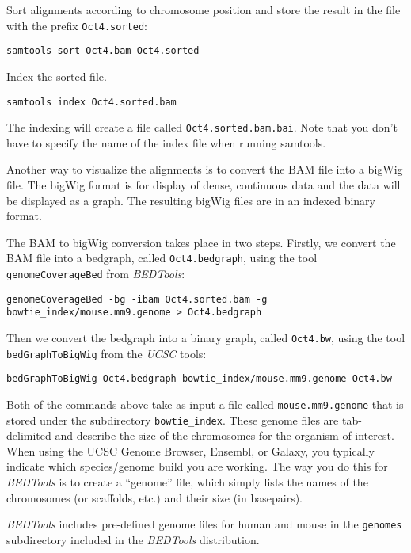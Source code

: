 \begin{steps}
Sort alignments according to chromosome position and store the result in the
file with the prefix \texttt{Oct4.sorted}:

\begin{lstlisting}
samtools sort Oct4.bam Oct4.sorted
\end{lstlisting}

Index the sorted file.

\begin{lstlisting}
samtools index Oct4.sorted.bam
\end{lstlisting}

The indexing will create a file called \texttt{Oct4.sorted.bam.bai}. Note that
you don't have to specify the name of the index file when running samtools.
\end{steps}

\begin{note}
Another way to visualize the alignments is to convert the BAM file into a bigWig
file. The bigWig format is for display of dense, continuous data and the data
will be displayed as a graph. The resulting bigWig files are in an indexed
binary format.
\end{note}

\begin{steps}
The BAM to bigWig conversion takes place in two steps. Firstly, we convert the
BAM file into a bedgraph, called \texttt{Oct4.bedgraph}, using the tool
\texttt{genomeCoverageBed} from \emph{BEDTools}:

\begin{lstlisting}
genomeCoverageBed -bg -ibam Oct4.sorted.bam -g bowtie_index/mouse.mm9.genome > Oct4.bedgraph
\end{lstlisting}

Then we convert the bedgraph into a binary graph, called \texttt{Oct4.bw}, using the
tool \texttt{bedGraphToBigWig} from the \emph{UCSC} tools:

\begin{lstlisting}
bedGraphToBigWig Oct4.bedgraph bowtie_index/mouse.mm9.genome Oct4.bw
\end{lstlisting}
\end{steps}

\begin{note}
Both of the commands above take as input a file called \texttt{mouse.mm9.genome} that
is stored under the subdirectory \texttt{bowtie\_index}. These genome files are
tab-delimited and describe the size of the chromosomes for the organism of
interest. When using the UCSC Genome Browser, Ensembl, or Galaxy, you typically
indicate which species/genome build you are working. The way you do this for
\emph{BEDTools} is to create a ``genome'' file, which simply lists the names of
the chromosomes (or scaffolds, etc.) and their size (in basepairs).

\emph{BEDTools} includes pre-defined genome files for human and mouse in the
\texttt{genomes} subdirectory included in the \emph{BEDTools} distribution.
\end{note}

